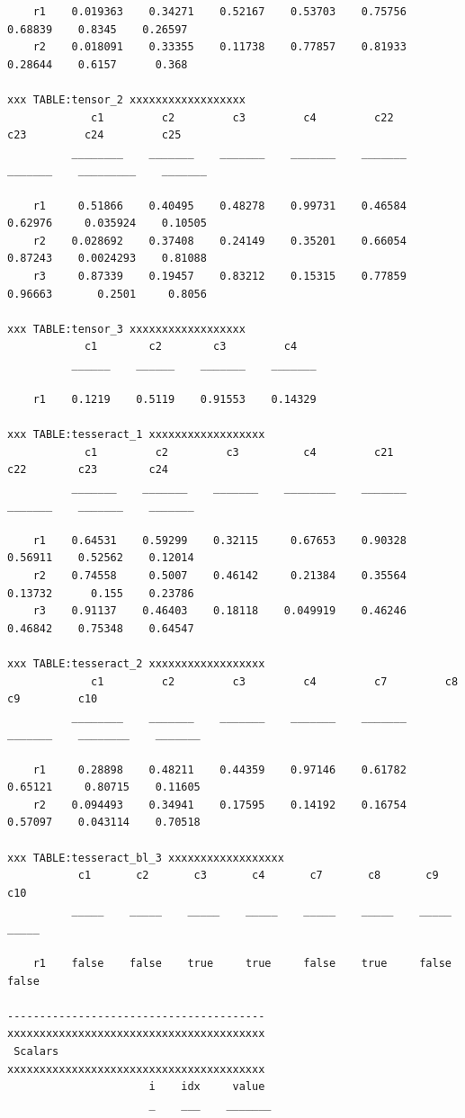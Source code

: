 \documentclass[
]{book}
\begin{document}
\begin{verbatim}
    r1    0.019363    0.34271    0.52167    0.53703    0.75756    0.68839    0.8345    0.26597
    r2    0.018091    0.33355    0.11738    0.77857    0.81933    0.28644    0.6157      0.368

xxx TABLE:tensor_2 xxxxxxxxxxxxxxxxxx
             c1         c2         c3         c4         c22        c23         c24         c25  
          ________    _______    _______    _______    _______    _______    _________    _______

    r1     0.51866    0.40495    0.48278    0.99731    0.46584    0.62976     0.035924    0.10505
    r2    0.028692    0.37408    0.24149    0.35201    0.66054    0.87243    0.0024293    0.81088
    r3     0.87339    0.19457    0.83212    0.15315    0.77859    0.96663       0.2501     0.8056

xxx TABLE:tensor_3 xxxxxxxxxxxxxxxxxx
            c1        c2        c3         c4   
          ______    ______    _______    _______

    r1    0.1219    0.5119    0.91553    0.14329

xxx TABLE:tesseract_1 xxxxxxxxxxxxxxxxxx
            c1         c2         c3          c4         c21        c22        c23        c24  
          _______    _______    _______    ________    _______    _______    _______    _______

    r1    0.64531    0.59299    0.32115     0.67653    0.90328    0.56911    0.52562    0.12014
    r2    0.74558     0.5007    0.46142     0.21384    0.35564    0.13732      0.155    0.23786
    r3    0.91137    0.46403    0.18118    0.049919    0.46246    0.46842    0.75348    0.64547

xxx TABLE:tesseract_2 xxxxxxxxxxxxxxxxxx
             c1         c2         c3         c4         c7         c8          c9         c10  
          ________    _______    _______    _______    _______    _______    ________    _______

    r1     0.28898    0.48211    0.44359    0.97146    0.61782    0.65121     0.80715    0.11605
    r2    0.094493    0.34941    0.17595    0.14192    0.16754    0.57097    0.043114    0.70518

xxx TABLE:tesseract_bl_3 xxxxxxxxxxxxxxxxxx
           c1       c2       c3       c4       c7       c8       c9       c10 
          _____    _____    _____    _____    _____    _____    _____    _____

    r1    false    false    true     true     false    true     false    false

----------------------------------------
xxxxxxxxxxxxxxxxxxxxxxxxxxxxxxxxxxxxxxxx
 Scalars
xxxxxxxxxxxxxxxxxxxxxxxxxxxxxxxxxxxxxxxx
                      i    idx     value 
                      _    ___    _______


\end{verbatim}
\end{document}
